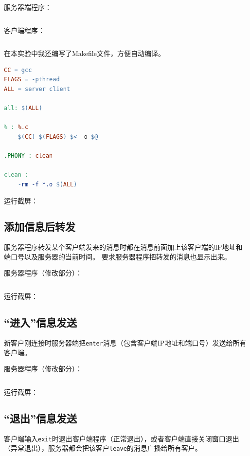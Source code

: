 \documentclass[logo,reportComp]{thesis}
\begin{document}
服务器端程序：
\begin{lstlisting}
\end{lstlisting}

客户端程序：
\begin{lstlisting}
\end{lstlisting}

在本实验中我还编写了Makefile文件，方便自动编译。
\begin{lstlisting}[language=make]
CC = gcc
FLAGS = -pthread
ALL = server client

all: $(ALL)

% : %.c
    $(CC) $(FLAGS) $< -o $@

.PHONY : clean

clean :
    -rm -f *.o $(ALL)
\end{lstlisting}

运行截屏：

\subsection{添加信息后转发}
服务器程序转发某个客户端发来的消息时都在消息前面加上该客户端的IP地址和端口号以及服务器的当前时间。
要求服务器程序把转发的消息也显示出来。

服务器程序（修改部分）：
\begin{lstlisting}
\end{lstlisting}

运行截屏：

\subsection{``进入''信息发送}
新客户刚连接时服务器端把\verb'enter'消息（包含客户端IP地址和端口号）发送给所有客户端。

服务器程序（修改部分）：
\begin{lstlisting}
\end{lstlisting}

运行截屏：

\subsection{``退出''信息发送}
客户端输入\verb'exit'时退出客户端程序（正常退出），或者客户端直接关闭窗口退出（异常退出），服务器都会把该客户\verb'leave'的消息广播给所有客户。
\end{document}
